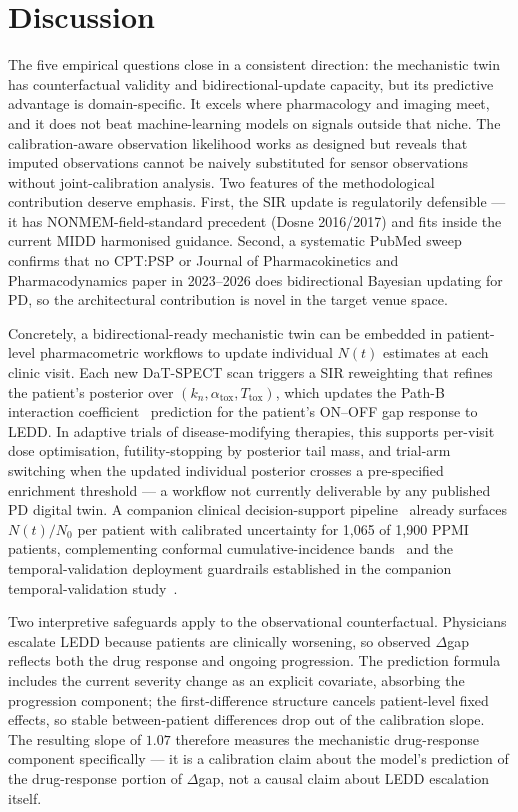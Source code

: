 \section{Discussion}

The five empirical questions close in a consistent direction: the mechanistic twin has counterfactual validity and bidirectional-update capacity, but its predictive advantage is domain-specific. It excels where pharmacology and imaging meet, and it does not beat machine-learning models on signals outside that niche. The calibration-aware observation likelihood works as designed but reveals that imputed observations cannot be naively substituted for sensor observations without joint-calibration analysis. Two features of the methodological contribution deserve emphasis. First, the SIR update is regulatorily defensible --- it has NONMEM-field-standard precedent (Dosne 2016/2017\cite{dosne2016sir,dosne2017automated}) and fits inside the current MIDD harmonised guidance\cite{ich_m15_2024,galluppi2024midd}. Second, a systematic PubMed sweep confirms that no CPT:PSP or Journal of Pharmacokinetics and Pharmacodynamics paper in 2023--2026 does bidirectional Bayesian updating for PD, so the architectural contribution is novel in the target venue space.

Concretely, a bidirectional-ready mechanistic twin can be embedded in patient-level pharmacometric workflows to update individual $N(t)$ estimates at each clinic visit. Each new DaT-SPECT scan triggers a SIR reweighting that refines the patient's posterior over $(k_n, \alpha_\text{tox}, T_\text{tox})$, which updates the Path-B interaction coefficient~\cite{dupre2026paper9} prediction for the patient's ON--OFF gap response to LEDD. In adaptive trials of disease-modifying therapies, this supports per-visit dose optimisation, futility-stopping by posterior tail mass, and trial-arm switching when the updated individual posterior crosses a pre-specified enrichment threshold --- a workflow not currently deliverable by any published PD digital twin. A companion clinical decision-support pipeline~\cite{dupre2026paper6} already surfaces $N(t)/N_0$ per patient with calibrated uncertainty for 1{,}065 of 1{,}900 PPMI patients, complementing conformal cumulative-incidence bands~\cite{dupre2026paper4} and the temporal-validation deployment guardrails established in the companion temporal-validation study~\cite{dupre2026paper5}.

Two interpretive safeguards apply to the observational counterfactual. Physicians escalate LEDD because patients are clinically worsening, so observed $\Delta$gap reflects both the drug response and ongoing progression. The prediction formula includes the current severity change as an explicit covariate, absorbing the progression component; the first-difference structure cancels patient-level fixed effects, so stable between-patient differences drop out of the calibration slope. The resulting slope of $1.07$ therefore measures the mechanistic drug-response component specifically --- it is a calibration claim about the model's prediction of the drug-response portion of $\Delta$gap, not a causal claim about LEDD escalation itself.

